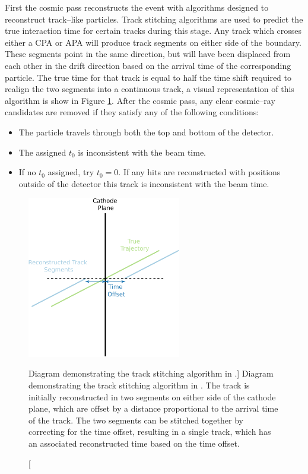 First the cosmic pass reconstructs the event with algorithms designed to 
reconstruct track--like particles. Track stitching algorithms are used to
predict the true interaction time for certain tracks during this stage. Any 
track which crosses either a CPA or APA will produce track segments on either 
side of the boundary. These segments point in the same direction, but will 
have been displaced from each other in the drift direction based on the 
arrival time of the corresponding particle. The true time for that track is 
equal to half the time shift required to realign the two segments into a 
continuous track, a visual representation of this algorithm is show in Figure 
\ref{fig:track_stitching}. After the cosmic pass, any clear cosmic--ray 
candidates are removed if they satisfy any of the following 
conditions\cite{protoduneperf}:
\begin{itemize}
	\item The particle travels through both the top and bottom of the detector.
	\item The assigned $t_0$ is inconsistent with the beam time.
	\item If no $t_0$ assigned, try $t_0 = 0$. If any hits are reconstructed 
		with positions outside of the detector this track is inconsistent with the 
		beam time.
\end{itemize}

\begin{figure}
	\centering
	\includegraphics[width=0.6\textwidth]{figures/track_stitch.pdf}
	\caption
	[Diagram demonstrating the track stitching algorithm in \protodune{}.]
	{Diagram demonstrating the track stitching algorithm in \protodune{}. The
	track is initially reconstructed in two segments on either side of the cathode
	plane, which are offset by a distance proportional to the arrival time of the
	track. The two segments can be stitched together by correcting for the time
	offset, resulting in a single track, which has an associated reconstructed
	time based on the time offset.}
	\label{fig:track_stitching}
\end{figure}

